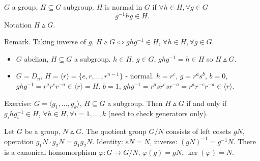 \documentclass[10pt, a4paper]{article}
\begin{document}
\begin{definition}
    $G$ a group,
    $H \subseteq G$ subgroup.
    $H$ is normal in $G$ if $\forall h \in H, \forall g \in G$
    \[
    g ^ {-1}hg \in H.
    \]
    Notation $H \vartriangle G$.
\end{definition}

Remark.
Taking inverse of $g$,
$H \vartriangle G \iff ghg ^ {-1} \in H$,
$\forall h \in H, \forall g \in G$.

\begin{example}
    \begin{itemize}
        \item $G$ abelian,
        $H \subseteq G$ a subgroup.
        $h \in H$,
        $g \in G$,
        $ghg ^ {-1} = h \in H$ so $H \vartriangle G$.

        \item $G = D_n$,
        $H = \langle r\rangle = \{e, r, \dotsc, r ^ {n - 1}\}$ -
        normal.
        $h = r ^ c$,
        $g = r ^ as ^ b$,
        $b = 0$,
        $ghg ^ {-1} = r ^ ar ^ cr ^ {-a} \in \langle r\rangle = H$.
        $b = 1$,
        $ghg ^ {-1} = r ^ asr^ csr ^ {-a} = r ^ ar ^ {-c}r ^ {-a} \in \langle r\rangle$.
    \end{itemize}
\end{example}

Exercise:
$G = \langle g_1, \dotsc, g_k\rangle$,
$H \subseteq G$ a subgroup.
Then $H \vartriangle G$ if and only if $g_ihg_i ^ {-1} \in H$,
$\forall h \in H, \forall i = 1, \dotsc, k$
(need to check generators only).

\begin{definition}
    Let $G$ be a group,
    $N \vartriangle G$.
    The quotient group $G / N$ consists of left cosets $gN$,
    operation $g_1N \cdot g_2N = g_1g_2N$.
    Identity:
    $eN = N$,
    inverse:
    $(gN) ^ {-1} = g ^ {-1}N$.
    There is a canonical homomorphism $\varphi : G \to G / N$,
    $\varphi(g) = gN$.
    $\ker(\varphi) = N$.
\end{definition}
\end{document}

